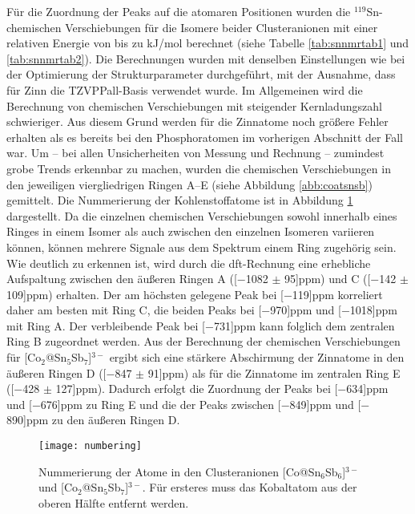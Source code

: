 Für die Zuordnung der Peaks auf die atomaren Positionen wurden die $^{119}$Sn-chemischen Verschiebungen für die Isomere beider Clusteranionen mit einer relativen Energie von bis zu \unit[10]{kJ/mol} berechnet (siehe Tabelle \ref{tab:snnmrtab1} und \ref{tab:snnmrtab2}). Die Berechnungen wurden mit denselben Einstellungen wie bei der Optimierung der Strukturparameter durchgeführt, mit der Ausnahme, dass für Zinn die TZVPPall-Basis\supercite{ahlrichs2000contracted} verwendet wurde. Im Allgemeinen wird die Berechnung von chemischen Verschiebungen mit steigender Kernladungszahl schwieriger. Aus diesem Grund werden für die Zinnatome noch größere Fehler erhalten als es bereits bei den Phosphoratomen im vorherigen Abschnitt der Fall war. Um -- bei allen Unsicherheiten von Messung und Rechnung -- zumindest grobe Trends erkennbar zu machen, wurden die chemischen Verschiebungen in den jeweiligen viergliedrigen Ringen A--E (siehe Abbildung \ref{abb:coatsnsb}) gemittelt. Die Nummerierung der Kohlenstoffatome ist in Abbildung \ref{abb:numbering} dargestellt. Da die einzelnen chemischen Verschiebungen sowohl innerhalb eines Ringes in einem Isomer als auch zwischen den einzelnen Isomeren variieren können, können mehrere Signale aus dem Spektrum einem Ring zugehörig sein. Wie deutlich zu erkennen ist, wird durch die \ac{dft}\--Rechnung eine erhebliche Aufspaltung zwischen den äußeren Ringen A (\unit[$-$1082 $\pm$ 95]{ppm}) und C (\unit[$-$142 $\pm$ 109]{ppm}) erhalten. Der am höchsten gelegene Peak bei \unit[$-$119]{ppm} korreliert daher am besten mit Ring C, die beiden Peaks bei \unit[$-$970]{ppm} und \unit[$-$1018]{ppm} mit Ring A. Der verbleibende Peak bei \unit[$-$731]{ppm} kann folglich dem zentralen Ring B zugeordnet werden. Aus der Berechnung der chemischen Verschiebungen für [Co$_2$@Sn$_5$Sb$_7$]$^{3-}$ ergibt sich eine stärkere Abschirmung der Zinnatome in den äußeren Ringen D (\unit[$-$847 $\pm$ 91]{ppm}) als für die Zinnatome im zentralen Ring E (\unit[$-$428 $\pm$ 127]{ppm}). Dadurch erfolgt die Zuordnung der Peaks bei \unit[$-$634]{ppm} und \unit[$-$676]{ppm} zu Ring E und die der Peaks zwischen \unit[$-$849]{ppm} und \unit[$-$890]{ppm} zu den äußeren Ringen D. 
\vspace{20pt}
\begin{figure}[ht!]
	\centering
	\texttt{[image: numbering]}
	\captionsetup{figurewithin = chapter}
	\captionsetup{font=small, labelfont=bf}\caption[Nummerierung der Atome in {[Co@Sn$_6$Sb$_6$]$^{3-}$} und {[Co$_2$@Sn$_5$Sb$_7$]$^{3-}$} ]{Nummerierung der Atome in den Clusteranionen [Co@Sn$_6$Sb$_6$]$^{3-}$ und [Co$_2$@Sn$_5$Sb$_7$]$^{3-}$. Für ersteres muss das Kobaltatom aus der oberen Hälfte entfernt werden.}
\label{abb:numbering}
\end{figure}
\vfill
\newpage

